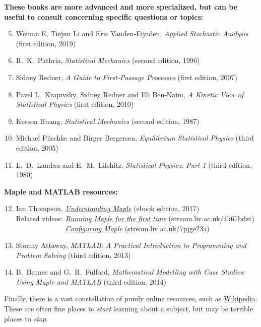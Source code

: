 \documentclass[12 pt]{article} %
\begin{document}
\noindent\textbf{These books are more advanced and more specialized, but can be useful to consult concerning specific questions or topics:} \\[-24 pt]
\begin{enumerate}
  \setcounter{enumi}{4}
  \item Weinan E, Tiejun Li and Eric Vanden-Eijnden, \textit{Applied Stochastic Analysis} (first edition, 2019)
  \item R.~K.~Pathria, \textit{Statistical Mechanics} (second edition, 1996)
  \item Sidney Redner, \textit{A Guide to First-Passage Processes} (first edition, 2007)
  \item Pavel L.~Krapivsky, Sidney Redner and Eli Ben-Naim, \textit{A Kinetic View of Statistical Physics} (first edition, 2010)
  \item Kerson Huang, \textit{Statistical Mechanics} (second edition, 1987)
  \item Michael Plischke and Birger Bergersen, \textit{Equilibrium Statistical Physics} (third edition, 2005)
  \item L.~D.~Landau and E.~M.~Lifshitz, \textit{Statistical Physics, Part 1} (third edition, 1980)
\end{enumerate}

\noindent\textbf{Maple and MATLAB resources:} \\[-24 pt]
\begin{enumerate}
  \setcounter{enumi}{11}
  \item Ian Thompson, \href{https://library.liv.ac.uk/record=b4395758~S8}{\textit{Understanding Maple}} (ebook edition, 2017) \\
        Related videos: \href{https://stream.liv.ac.uk/4k67bdzt}{\textit{Running Maple for the first time}} (stream.liv.ac.uk/4k67bdzt) \\
        \textcolor{white}{Related videos:} \href{https://stream.liv.ac.uk/7pjge23a}{\textit{Configuring Maple}} (stream.liv.ac.uk/7pjge23a)
  \item Stormy Attaway, \textit{MATLAB: A Practical Introduction to Programming and Problem Solving} (third edition, 2013)
  \item B.~Barnes and G.~R.~Fulford, \textit{Mathematical Modelling with Case Studies: Using Maple and MATLAB} (third edition, 2014)
\end{enumerate}

Finally, there is a vast constellation of purely online resources, such as \href{https://en.wikipedia.org/wiki/Statistical_physics}{Wikipedia}.
These are often fine places to \emph{start} learning about a subject, but may be terrible places to \emph{stop}.
\end{document}
